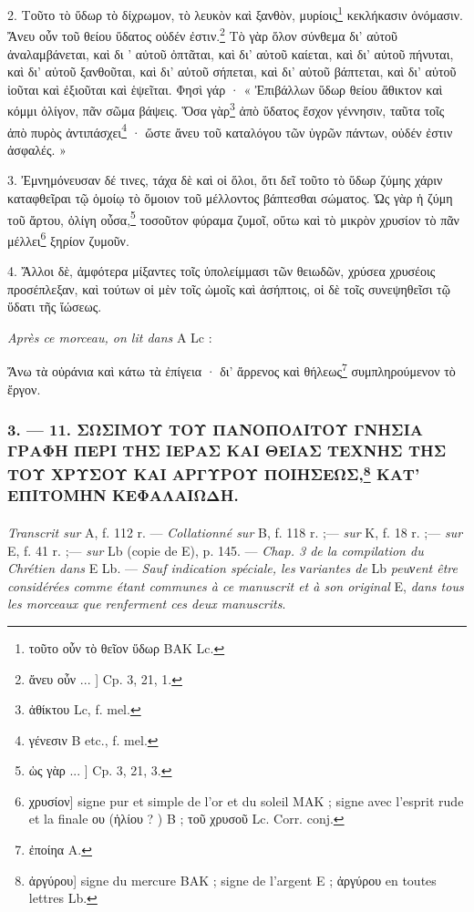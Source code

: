 \documentclass[landscape, a4paper, 11pt, oneside, polutonikogreek, french]{article}
\begin{document}
2. Τοῦτο τὸ ὕδωρ τὸ δίχρωμον, τὸ λευκὸν καὶ ξανθὸν, μυρίοις\footnote{τοῦτο οὖν τὸ θεῖον ὕδωρ BAK Lc.} κεκλήκασιν ὀνόμασιν. Ἄνευ οὖν τοῦ θείου ὕδατος οὐδέν ἐστιν.\footnote{ἄνευ οὖν ... ] Cp. 3, 21, 1.} Τὸ γὰρ ὅλον σύνθεμα δι' αὐτοῦ ἀναλαμβάνεται, καὶ δι ' αὐτοῦ ὀπτᾶται, καὶ δι' αὐτοῦ καίεται, καὶ δι' αὐτοῦ πήνυται, καὶ δι' αὐτοῦ ξανθοῦται, καὶ δι' αὐτοῦ σήπεται, καὶ δι' αὐτοῦ βάπτεται, καὶ δι' αὐτοῦ ἰοῦται καὶ ἐξιοῦται καὶ ἑψεῖται. Φησὶ γάρ · « Ἐπιβάλλων ὕδωρ θείου ἄθικτον καὶ κόμμι ὀλίγον, πᾶν σῶμα βάψεις. Ὅσα γὰρ\footnote{ἀθίκτου Lc, f. mel.} ἀπὸ ὕδατος ἔσχον γέννησιν, ταῦτα τοῖς ἀπὸ πυρὸς ἀντιπάσχει\footnote{γένεσιν B etc., f. mel.} · ὥστε ἄνευ τοῦ καταλόγου τῶν ὑγρῶν πάντων, οὐδέν ἐστιν ἀσφαλές. »

3. Ἐμνημόνευσαν δέ τινες, τάχα δὲ καὶ οἱ ὅλοι, ὅτι δεῖ τοῦτο τὸ ὕδωρ ζύμης χάριν καταφθεῖραι τῷ ὁμοίῳ τὸ ὅμοιον τοῦ μέλλοντος βάπτεσθαι σώματος. Ὡς γὰρ ἡ ζύμη τοῦ ἄρτου, ὀλίγη οὖσα,\footnote{ὡς γὰρ ... ] Cp. 3, 21, 3.} τοσοῦτον φύραμα ζυμοῖ, οὕτω καὶ τὸ μικρὸν χρυσίον τὸ πᾶν μέλλει\footnote{χρυσίον] signe pur et simple de l'or et du soleil MAK ; signe avec l'esprit rude et la finale ου (ἡλίου ? ) B ; τοῦ χρυσοῦ Lc. Corr. conj.} ξηρίον ζυμοῦν.

4. Ἄλλοι δὲ, ἀμφότερα μίξαντες τοῖς ὑπολείμμασι τῶν θειωδῶν, χρύσεα χρυσέοις προσέπλεξαν, καὶ τούτων οἱ μὲν τοῖς ὠμοῖς καὶ ἀσήπτοις, οἱ δὲ τοῖς συνεψηθεῖσι τῷ ὕδατι τῆς ἴώσεως.

\bigskip
\centerline{\EightStarTaper}
\centerline{\EightStarTaper\EightStarTaper}
\bigskip

\emph{Après ce morceau, on lit dans} A Lc :

Ἄνω τὰ οὐράνια καὶ κάτω τὰ ἐπίγεια · δι' ἄρρενος καὶ θήλεως\footnote{ἐποίηα A.} συμπληρούμενον τὸ ἔργον.

\bigskip
\centerline{\EightStarTaper}
\centerline{\EightStarTaper\EightStarTaper}
\bigskip

\subsubsection[3. --- 11. ΣΩΣΙΜΟΥ ΤΟΥ ΠΑΝΟΠΟΛΙΤΟΥ ΓΝΗΣΙΑ ΓΡΑΦΗ ΠΕΡΙ ΤΗΣ ΙΕΡΑΣ ΚΑΙ ΘΕΙΑΣ ΤΕΧΝΗΣ ΤΗΣ ΤΟΥ ΧΡΥΣΟΥ ΚΑΙ ΑΡΓΥΡΟΥ ΠΟΙΗΣΕΩΣ, ΚΑΤ' ΕΠΙΤΟΜΗΝ ΚΕΦΑΛΑΙΩΔΗ.]{3. --- 11. ΣΩΣΙΜΟΥ ΤΟΥ ΠΑΝΟΠΟΛΙΤΟΥ ΓΝΗΣΙΑ ΓΡΑΦΗ ΠΕΡΙ ΤΗΣ ΙΕΡΑΣ ΚΑΙ ΘΕΙΑΣ ΤΕΧΝΗΣ ΤΗΣ ΤΟΥ ΧΡΥΣΟΥ ΚΑΙ ΑΡΓΥΡΟΥ ΠΟΙΗΣΕΩΣ,\footnote{ἀργύρου] signe du mercure BAK ; signe de l'argent E ; ἀργύρου en toutes lettres Lb.} ΚΑΤ' ΕΠΙΤΟΜΗΝ ΚΕΦΑΛΑΙΩΔΗ.}
\paragraph{}
\emph{Transcrit sur} A, f. 112 r. --- \emph{Collationné sur} B, f. 118 r. ;--- \emph{sur} K, f. 18 r. ;--- \emph{sur} E, f. 41 r. ;--- \emph{sur} Lb (copie de E), p. 145. --- \emph{Chap. 3 de la compilation du Chrétien dans} E Lb. --- \emph{Sauf indication spéciale, les νariantes de} Lb \emph{peuνent être considérées comme étant communes à ce manuscrit et à son original} E, \emph{dans tous les morceaux que renferment ces deux manuscrits}.
\end{document}
